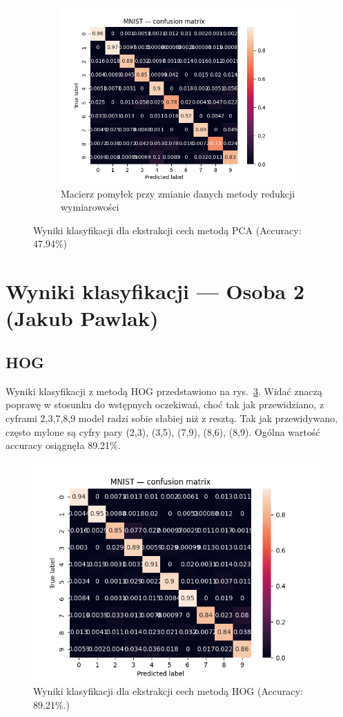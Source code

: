 \documentclass[10pt]{article}
\begin{document}
\begin{figure}[H]
\begin{subfigure}[t]{.32\textwidth}
        \includegraphics[width=\linewidth]{img/PCA/PCA_best_error_matrix}
        \caption{Macierz pomyłek przy zmianie danych metody redukcji wymiarowości}\label{fig:best-pca}
    \end{subfigure}

    \caption{Wyniki klasyfikacji dla ekstrakcji cech metodą PCA (Accuracy: 47.94\%)}
\end{figure}

\pagebreak

\section{Wyniki klasyfikacji --- Osoba 2 (Jakub Pawlak)}

\subsection*{HOG}

Wyniki klasyfikacji z metodą HOG przedstawiono na rys.~\ref{fig:hog-cm}.
Widać znaczą poprawę w stosunku do wstępnych oczekiwań, choć tak jak przewidziano, z cyframi 2,3,7,8,9 model radzi sobie słabiej niż z resztą.
Tak jak przewidywano, często mylone są cyfry pary (2,3), (3,5), (7,9), (8,6), (8,9).
Ogólna wartość accuracy osiągnęła 89.21\%.

\begin{figure}[H]
    \centering
    \includegraphics[width=.5\linewidth]{img/mnist_hog_cm.png}
    \caption{Wyniki klasyfikacji dla ekstrakcji cech metodą HOG (Accuracy: 89.21\%.)}\label{fig:hog-cm}
\end{figure}
\end{document}
